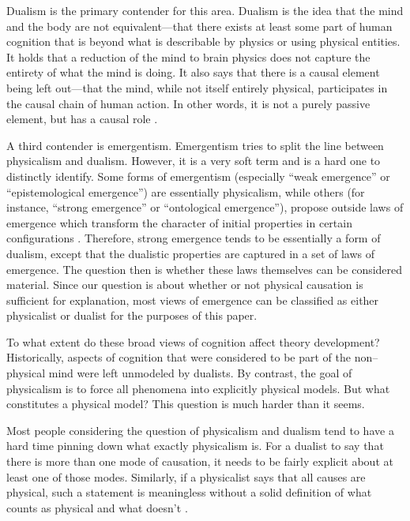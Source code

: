 Dualism is the primary contender for this area.  Dualism is the idea that the mind and the body are not equivalent---that there exists at least some part of human cognition that is beyond what is describable by physics or using physical entities.  It holds that a reduction of the mind to brain physics does not capture the entirety of what the mind is doing.  It also says that there is a causal element being left out---that the mind, while not itself entirely physical, participates in the causal chain of human action.  In other words, it is not a purely passive element, but has a causal role \citep{heart1994}.

A third contender is emergentism.  Emergentism tries to split the line between physicalism and dualism.  However, it is a very soft term and is a hard one to distinctly identify.  Some forms of emergentism (especially ``weak emergence'' or ``epistemological emergence'') are essentially physicalism, while others (for instance, ``strong emergence'' or ``ontological emergence''), propose outside laws of emergence which transform the character of initial properties in certain configurations \citep{oconnorwong2012}.  Therefore, strong emergence tends to be essentially a form of dualism, except that the dualistic properties are captured in a set of laws of emergence.  The question then is whether these laws themselves can be considered material.  Since our question is about whether or not physical causation is sufficient for explanation, most views of emergence can be classified as either physicalist or dualist for the purposes of this paper.

To what extent do these broad views of cognition affect theory development?  Historically, aspects of cognition that were considered to be part of the non--physical mind were left unmodeled by dualists.  By contrast, the goal of physicalism is to force all phenomena into explicitly physical models.  But what constitutes a physical model?  This question is much harder than it seems.

Most people considering the question of physicalism and dualism tend to have a hard time pinning down what exactly physicalism is.  For a dualist to say that there is more than one mode of causation, it needs to be fairly explicit about at least one of those modes.  Similarly, if a physicalist says that all causes are physical, such a statement is meaningless without a solid definition of what counts as physical and what doesn't \citep{stoljar2009}.

